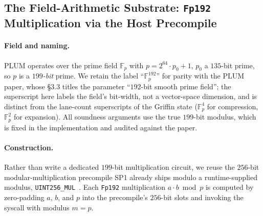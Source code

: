 \subsection{The Field-Arithmetic Substrate: \texttt{Fp192} Multiplication via the Host Precompile}\label{ssec:bigint}
\paragraph{Field and naming.}
PLUM operates over the prime field $\mathbb{F}_p$ with $p = 2^{64}\cdot p_0 + 1$, $p_0$ a $135$-bit prime, so $p$ is a \emph{$199$-bit} prime. We retain the label ``$\mathbb{F}_p^{192}$'' for parity with the PLUM paper, whose \S3.3 titles the parameter ``$192$-bit smooth prime field''; the superscript here labels the field's bit-width, not a vector-space dimension, and is distinct from the lane-count superscripts of the Griffin state ($\mathbb{F}_p^{4}$ for compression, $\mathbb{F}_p^{2}$ for expansion). All soundness arguments use the true $199$-bit modulus, which is fixed in the implementation and audited against the paper.

\paragraph{Construction.}
Rather than write a dedicated $199$-bit multiplication circuit, we reuse the $256$-bit modular-multiplication precompile SP1 already ships modulo a runtime-supplied modulus, \texttt{UINT256\_MUL}~\cite{succinct2024sp1}. Each \texttt{Fp192} multiplication $a\cdot b \bmod p$ is computed by zero-padding $a$, $b$, and $p$ into the precompile's $256$-bit slots and invoking the syscall with modulus $m=p$.

